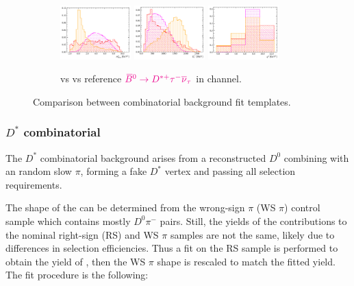 \begin{figure}[!htb]
    \begin{subfigure}[t]{\textwidth}
        \centering
        \includegraphics[width=0.3\textwidth]{figs-fit-fit-templates/histo-comp/Dst_iso_DstTau__vs__Dst_iso_BComb__vs__Dst_iso_DstComb__m2miss.pdf}
        \includegraphics[width=0.3\textwidth]{figs-fit-fit-templates/histo-comp/Dst_iso_DstTau__vs__Dst_iso_BComb__vs__Dst_iso_DstComb__el.pdf}
        \includegraphics[width=0.3\textwidth]{figs-fit-fit-templates/histo-comp/Dst_iso_DstTau__vs__Dst_iso_BComb__vs__Dst_iso_DstComb__q2.pdf}
        \caption{
            \textcolor{red}{\BComb} vs \textcolor{orange}{\DstComb} vs
            reference
            $\textcolor{magenta}{{{\kern 0.18em\overline{\kern -0.18em B}}{}^0} \rightarrow {\ensuremath{{D}^{*+}}}{\ensuremath{\tau^-}}{\ensuremath{{\overline{\nu}}_\tau}}}$
            in \Dstar channel.
        }
    \end{subfigure}

    \caption{
        Comparison between combinatorial background fit templates.
    }
    \label{fig:comb-templates}
\end{figure}

\subsubsection{$D^*$ combinatorial}
\label{dst-comb}

The $D^*$ combinatorial background arises from a reconstructed $D^0$
combining with an random slow $\pi$, forming a fake $D^*$ vertex and
passing all selection requirements.

The shape of the \DstComb can be determined from the wrong-sign $\pi$ (WS $\pi$)
control sample which contains mostly $D^0 \pi^-$ pairs.
Still, the yields of the \DstComb contributions to the nominal right-sign (RS)
and WS $\pi$ samples are not the same,
likely due to differences in selection efficiencies.
Thus a fit on the RS sample is performed to obtain
the yield of \DstComb, then the WS $\pi$ shape is rescaled to match the fitted
yield.
The fit procedure is the following:


